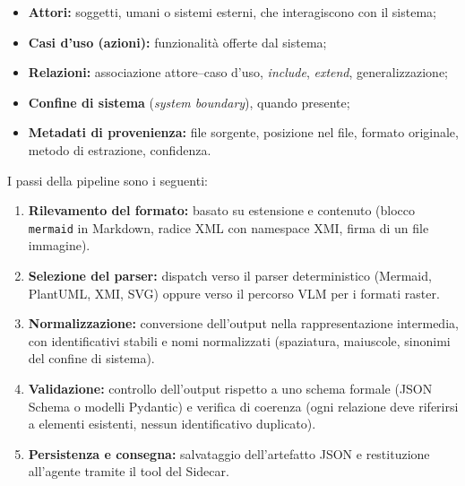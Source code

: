 \documentclass[a4paper, 11pt]{article}
\begin{document}
\begin{itemize}[noitemsep]
    \item \textbf{Attori:} soggetti, umani o sistemi esterni, che interagiscono con il sistema;
    \item \textbf{Casi d'uso (azioni):} funzionalità offerte dal sistema;
    \item \textbf{Relazioni:} associazione attore--caso d'uso, \textit{include}, \textit{extend}, generalizzazione;
    \item \textbf{Confine di sistema} (\textit{system boundary}), quando presente;
    \item \textbf{Metadati di provenienza:} file sorgente, posizione nel file, formato originale, metodo di estrazione, confidenza.
\end{itemize}

I passi della pipeline sono i seguenti:

\begin{enumerate}
    \item \textbf{Rilevamento del formato:} basato su estensione e contenuto (blocco \texttt{mermaid} in Markdown, radice XML con namespace XMI, firma di un file immagine).
    \item \textbf{Selezione del parser:} dispatch verso il parser deterministico (Mermaid, PlantUML, XMI, SVG) oppure verso il percorso VLM per i formati raster.
    \item \textbf{Normalizzazione:} conversione dell'output nella rappresentazione intermedia, con identificativi stabili e nomi normalizzati (spaziatura, maiuscole, sinonimi del confine di sistema).
    \item \textbf{Validazione:} controllo dell'output rispetto a uno schema formale (JSON Schema o modelli Pydantic) e verifica di coerenza (ogni relazione deve riferirsi a elementi esistenti, nessun identificativo duplicato).
    \item \textbf{Persistenza e consegna:} salvataggio dell'artefatto JSON e restituzione all'agente tramite il tool del Sidecar.
\end{enumerate}
\end{document}

